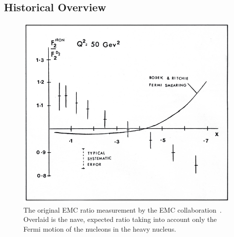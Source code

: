 \subsection{Historical Overview} \label{ssec:emc-history}

\begin{figure}
	\centering
	\includegraphics[height=0.35\textheight]{figures/background/emc_effect_original-v2.jpg}
	\caption{The original EMC ratio measurement by the EMC collaboration~\cite{Aubert:1983xm}. Overlaid is the nave, expected ratio taking into account only the Fermi motion of the nucleons in the heavy nucleus.}
	\label{fig:emc-one-naive}
\end{figure}

